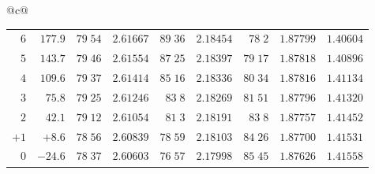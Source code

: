 \begin{center}
{\begin{tabular}{@{}c@{}}
\begin{tabular}{r|r|r|r|r|r|r|r|r}
$6$&$177.9$&$79\;54$&$2.61667$&$89\;36$&$2.18454$&$78\;2$&$1.87799$&$1.40604$\\[2pt]
$5$&$143.7$&$79\;46$&$2.61554$&$87\;25$&$2.18397$&$79\;17$&$1.87818$&$1.40896$\\
$4$&$109.6$&$79\;37$&$2.61414$&$85\;16$&$2.18336$&$80\;34$&$1.87816$&$1.41134$\\
$3$&$75.8$&$79\;25$&$2.61246$&$83\;8$&$2.18269$&$81\;51$&$1.87796$&$1.41320$\\
$2$&$42.1$&$79\;12$&$2.61054$&$81\;3$&$2.18191$&$83\;8$&$1.87757$&$1.41452$\\
$+1$&$+8.6$&$78\;56$&$2.60839$&$78\;59$&$2.18103$&$84\;26$&$1.87700$&$1.41531$\\[2pt]
$0$&$-24.6$&$78\;37$&$2.60603$&$76\;57$&$2.17998$&$85\;45$&$1.87626$&$1.41558$\\
\end{tabular}
\end{tabular}%
}
\end{center}
\endgroup
\clearpage
{}
\begingroup
\fontsize{9}{10.2}\selectfont
\setlength{\tabcolsep}{1.5pt}
\renewcommand{\arraystretch}{1.02}
